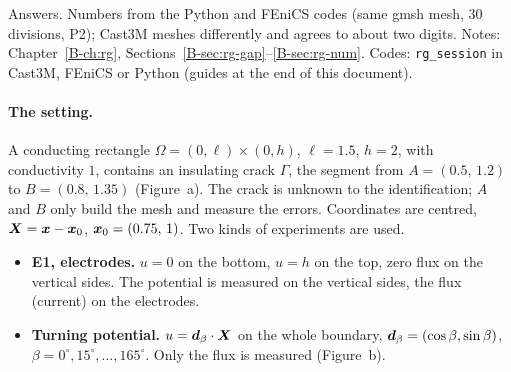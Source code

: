 \ifanswers
{}
  {Answers. Numbers from the Python and FEniCS codes (same gmsh mesh,
   $30$ divisions, P2); Cast3M meshes differently and agrees to about
   two digits.}
\else
{}
  {Notes: Chapter~\ref{B-ch:rg}, Sections~\ref{B-sec:rg-gap}--\ref{B-sec:rg-num}.
   Codes: \texttt{rg\_session} in Cast3M, FEniCS or Python (guides at the
   end of this document).}
\fi

\paragraph{The setting.} A conducting rectangle $\Omega=(0,\ell)\times(0,h)$,
$\ell=1.5$, $h=2$, with conductivity $1$, contains an insulating crack
$\Gamma$, the segment from $A=(0.5,\,1.2)$ to $B=(0.8,\,1.35)$
(Figure~a). The crack is unknown to the identification; $A$ and $B$ only
build the mesh and measure the errors. Coordinates are centred,
$\bm{X}=\bm{x}-\bm{x}_0$, $\bm{x}_0=(0.75,\,1)$. Two kinds of experiments are used.
\begin{itemize}[itemsep=1pt,topsep=2pt]
\item \textbf{E1, electrodes.} $u=0$ on the bottom, $u=h$ on the top, zero
flux on the vertical sides. The potential is measured on the vertical
sides, the flux (current) on the electrodes.
\item \textbf{Turning potential.} $u=\bm{d}_\beta\cdot\bm{X}$ on the whole
boundary, $\bm{d}_\beta=(\cos\beta,\sin\beta)$, $\beta=0^\circ,15^\circ,
\dots,165^\circ$. Only the flux is measured (Figure~b).
\end{itemize}

